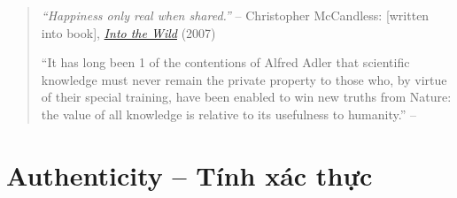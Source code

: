 \documentclass[12pt,oneside]{book}
\begin{document}
\begin{quotation}
	{\it``Happiness only real when shared.''} -- {\sc Christopher McCandless}: {\rm[written into book]}, \href{https://www.imdb.com/title/tt0758758}{\it Into the Wild} (2007)
	
	``It has long been 1 of the contentions of {\sc Alfred Adler} that scientific knowledge must never remain the private property to those who, by virtue of their special training, have been enabled to win new truths from Nature: the value of all knowledge is relative to its usefulness to humanity.'' -- \cite[Translator's Preface, p. vii]{Adler_human_nature}
\end{quotation}

\section{Authenticity -- Tính xác thực}
\end{document}
